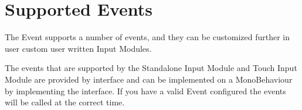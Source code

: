 \chapter{Supported Events}
\hypertarget{md__hey_tea_9_2_library_2_package_cache_2com_8unity_8ugui_0d1_80_80_2_documentation_0i_2_supported_events}{}\label{md__hey_tea_9_2_library_2_package_cache_2com_8unity_8ugui_0d1_80_80_2_documentation_0i_2_supported_events}
\label{md__hey_tea_9_2_library_2_package_cache_2com_8unity_8ugui_0d1_80_80_2_documentation_0i_2_supported_events_autotoc_md4957}%
%
 The Event  supports a number of events, and they can be customized further in user custom user written Input Modules.

The events that are supported by the Standalone Input Module and Touch Input Module are provided by interface and can be implemented on a Mono\+Behaviour by implementing the interface. If you have a valid Event  configured the events will be called at the correct time.


